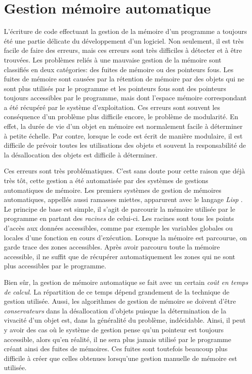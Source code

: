 \documentclass[12pt,oneside,letterpaper,francais]{book}
\newcommand{\lisp}{{\textit{Lisp }}}
\begin{document}
\section{Gestion mémoire automatique}

L'écriture de code effectuant la gestion de la mémoire d'un programme
a toujours été une partie délicate du développement d'un logiciel. Non
seulement, il est très facile de faire des erreurs, mais ces erreurs
sont très difficiles à détecter et à être trouvées. Les problèmes
reliés à une mauvaise gestion de la mémoire sont classifiés en deux
catégories: des fuites de mémoire ou des pointeurs fous. Les fuites de
mémoire sont causées par la rétention de mémoire par des objets qui ne
sont plus utilisés par le programme et les pointeurs fous sont des
pointeurs toujours accessibles par le programme, mais dont l'espace
mémoire correspondant a été récupéré par le système
d'exploitation. Ces erreurs sont souvent les conséquence d'un problème
plus difficile encore, le problème de modularité. En effet, la durée
de vie d'un objet en mémoire est normalement facile à déterminer à
petite échelle. Par contre, lorsque le code est écrit de manière
modulaire, il est difficile de prévoir toutes les utilisations des
objets et souvent la responsabilité de la désallocation des objets est
difficile à déterminer.

Ces erreurs sont très problématiques. C'est sans doute pour cette
raison que déjà très tôt, cette gestion a été automatisée par des
systèmes de gestions automatiques de mémoire. Les premiers systèmes de
gestion de mémoires automatiques, appellés aussi ramasses miettes,
apparurent avec le langage \lisp. Le principe de base est simple, il
s'agit de parcourir la mémoire utilisée par le programme en partant
des \emph{racines} de celui-ci. Les racines sont tous les points
d'accès aux données accessibles, comme par exemple les variables
globales ou locales d'une fonction en cours d'exécution. Lorsque la
mémoire est parcourue, on garde trace des zones accessibles. Après
avoir parcouru toute la mémoire accessible, il ne suffit que de
récupérer automatiquement les zones qui ne sont plus accessibles par
le programme.

Bien sûr, la gestion de mémoire automatique se fait avec un certain
\emph{coût en temps de calcul}. La répartition de ce temps dépend
grandement de la technique de gestion utilisée. Aussi, les algorithmes
de gestion de mémoire se doivent d'être \emph{conservateurs} dans la
désallocation d'objets puisque la détermination de la vivacité d'un
objet est, dans la généralité du problème, indécidable. Ainsi, il peut
y avoir des cas où le système de gestion pense qu'un pointeur est
toujours accessible, alors qu'en réalité, il ne sera plus jamais
utilisé par le programme créant ainsi des fuites de mémoires. Ces
fuites sont toutefois beaucoup plus difficile à créer que celles
obtenues lorsqu'une gestion manuelle de mémoire est utilisée.
\end{document}
